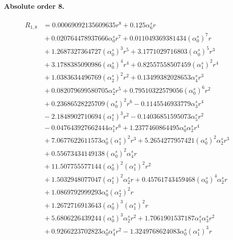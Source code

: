 \documentclass[10pt]{article}
\begin{document}
\paragraph{Absolute order 8.}
\begin{align*}
R_{1,8} &= 0.00069092135609635 r^{8} + 0.125 \alpha_{6}^s r \\
&{}  + 0.020764478937666 \alpha_{0}^s r^{7} + 0.011049369381434 \left(\alpha_{0}^s\right)^{7} r \\
&{}  + 1.2687327364727 \left(\alpha_{0}^s\right)^{3} r^{5} + 3.1771029716803 \left(\alpha_{0}^s\right)^{5} r^{3} \\
&{}  + 3.1788385090986 \left(\alpha_{0}^s\right)^{4} r^{4} + 0.82557558507459 \left(\alpha_{1}^s\right)^{2} r^{4} \\
&{}  + 1.0383634496769 \left(\alpha_{2}^s\right)^{2} r^{2} + 0.13499382028653 \alpha_{4}^s r^{3} \\
&{}  + 0.082079699580705 \alpha_{2}^s r^{5} + 0.79510322579056 \left(\alpha_{0}^s\right)^{6} r^{2} \\
&{}  + 0.23686528225709 \left(\alpha_{0}^s\right)^{2} r^{6} - 0.1145546933779 \alpha_{3}^s r^{4} \\
&{}  - 2.1848902710694 \left(\alpha_{1}^s\right)^{3} r^{2} - 0.14036851595073 \alpha_{5}^s r^{2} \\
&{}  - 0.047643927662444 \alpha_{1}^s r^{6} + 1.2377460864495 \alpha_{0}^s \alpha_{2}^s r^{4} \\
&{}  + 7.0677622611573 \alpha_{0}^s \left(\alpha_{1}^s\right)^{2} r^{3} + 5.2654277957421 \left(\alpha_{0}^s\right)^{2} \alpha_{2}^s r^{3} \\
&{}  + 0.55673434149138 \left(\alpha_{0}^s\right)^{2} \alpha_{4}^s r \\
&{}  + 11.507755577144 \left(\alpha_{0}^s\right)^{2} \left(\alpha_{1}^s\right)^{2} r^{2} \\
&{}  + 1.5032948077047 \left(\alpha_{1}^s\right)^{2} \alpha_{2}^s r + 0.45761743459468 \left(\alpha_{0}^s\right)^{4} \alpha_{2}^s r \\
&{}  + 1.0869792999293 \alpha_{0}^s \left(\alpha_{2}^s\right)^{2} r \\
&{}  + 1.2672716913643 \left(\alpha_{0}^s\right)^{3} \left(\alpha_{1}^s\right)^{2} r \\
&{}  + 5.6806226439244 \left(\alpha_{0}^s\right)^{3} \alpha_{2}^s r^{2} + 1.7061901537187 \alpha_{1}^s \alpha_{3}^s r^{2} \\
&{}  + 0.9266223702823 \alpha_{0}^s \alpha_{4}^s r^{2} - 1.3249768624083 \alpha_{0}^s \left(\alpha_{1}^s\right)^{3} r \\

\end{align*}
\end{document}

